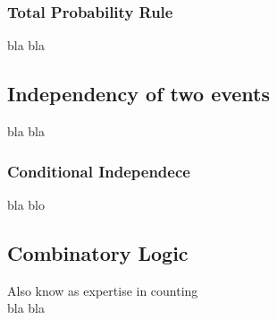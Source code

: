 \subsubsection{Total Probability Rule}
bla bla

\subsection{Independency of two events}
bla bla

\subsubsection{Conditional Independece}
bla blo

\subsection{Combinatory Logic}
Also know as expertise in counting \\
bla bla

